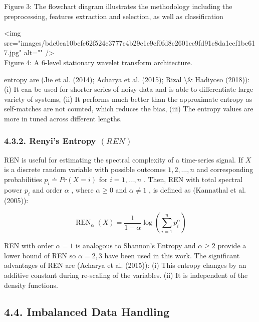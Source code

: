 \documentclass{article}
\begin{document}
Figure 3: The flowchart diagram illustrates the methodology including the preprocessing, features extraction and selection, as well as classification

<img src="images/bdc0ca10bcfc62f524c3777c4b29c1e9cf0fd8c2601ee9fd91c8da1eef1be617.jpg" alt="" />\\
Figure 4: A 6-level stationary wavelet transform architecture.

entropy are (Jie et al. (2014); Acharya et al. (2015); Rizal \textbackslash{}& Hadiyoso (2018)): (i) It can be used for shorter series of noisy data and is able to differentiate large variety of systems, (ii) It performs much better than the approximate entropy as self-matches are not counted, which reduces the bias, (iii) The entropy values are more in tuned across different lengths.

\subsubsection{4.3.2. Renyi’s Entropy $(R E N)$}

REN is useful for estimating the spectral complexity of a time-series signal. If $X$ is a discrete random variable with possible outcomes $1,2,\ldots,n$ and corresponding probabilities $p_{i}\doteq P r(X=i)$ for $i=1,\ldots,n$ . Then, REN with total spectral power $p_{i}$ and order $\alpha$ , where $\alpha\geq0$ and $\alpha\neq1$ , is defined as (Kannathal et al. (2005)):

\begin{equation}
\operatorname{REN}_{\alpha}(X)={\frac{1}{1-\alpha}}\log\left(\sum_{i=1}^{n}p_{i}^{\alpha}\right)
\end{equation}



REN with order $\alpha=1$ is analogous to Shannon’s Entropy and $\alpha\geq2$ provide a lower bound of REN so $\alpha=2,3$ have been used in this work. The significant advantages of REN are (Acharya et al. (2015)): (i) This entropy changes by an additive constant during re-scaling of the variables. (ii) It is independent of the density functions.

\subsection{4.4. Imbalanced Data Handling}
\end{document}

